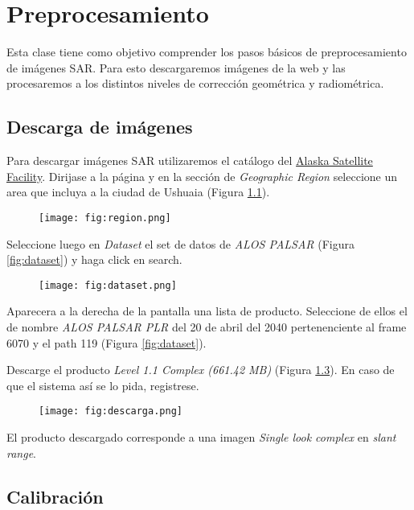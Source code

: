 \chapter{Preprocesamiento}

Esta clase tiene como objetivo comprender los pasos básicos de preprocesamiento de imágenes SAR. Para esto descargaremos imágenes de la web y las procesaremos a los distintos niveles de corrección geométrica y radiométrica.

\section{Descarga de imágenes}

Para descargar imágenes SAR utilizaremos el catálogo del \href{https://vertex.daac.asf.alaska.edu/}{Alaska Satellite Facility}. Dirijase a la página y en la sección de \emph{Geographic Region} seleccione un area que incluya a la ciudad de Ushuaia (Figura \ref{fig:region}).

\begin{figure}[h!]
    \centering
    \texttt{[image: fig:region.png]}
    \caption{}
    \label{fig:region}
\end{figure}

Seleccione luego en \emph{Dataset} el set de datos de \emph{ALOS PALSAR} (Figura \ref{fig:dataset}) y haga click en search.

\begin{figure}[h!]
    \centering
    \texttt{[image: fig:dataset.png]}
    \caption{}
    \label{fit:dataset}
\end{figure}

Aparecera a la derecha de la pantalla una lista de producto. Seleccione de ellos el de nombre \emph{ALOS PALSAR PLR} del 20 de abril del 2040 pertenenciente al frame 6070 y el path 119 (Figura \ref{fig:dataset}).

Descarge el producto \emph{Level 1.1 Complex (661.42 MB)} (Figura \ref{fig:descarga}). En caso de que el sistema así se lo pida, registrese.

\begin{figure}[h!]
    \centering
    \texttt{[image: fig:descarga.png]}
    \caption{}
    \label{fig:descarga}
\end{figure}

El producto descargado corresponde a una imagen \emph{Single look complex} en \emph{slant range}.

\section{Calibración}

